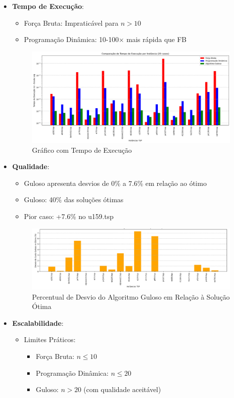 \begin{itemize}
\item \textbf{Tempo de Execução}:
  \begin{itemize}
  \item Força Bruta: Impraticável para $n > 10$
  \item Programação Dinâmica: 10-100× mais rápida que FB
  \end{itemize}

  \begin{figure}[!htb]
    \centering
    \includegraphics[width=.9\textwidth]{images/analise_detalhada_tempo_de_execucao.png}
    \caption{Gráfico com Tempo de Execução}
    \label{fig:aa}
    \end{figure}
  
\item \textbf{Qualidade}:
  \begin{itemize}
    \item Guloso apresenta desvios de 0\% a 7.6\% em relação ao ótimo
  \item Guloso: 40\% das soluções ótimas
  \item Pior caso: +7.6\% no u159.tsp
  \end{itemize}

  \begin{figure}[!htb]
    \centering
    \includegraphics[width=.9\textwidth]{images/qualidade.png}
    \caption{Percentual de Desvio do Algoritmo Guloso em Relação à Solução Ótima}
    \label{fig:aa}
    \end{figure}

\item \textbf{Escalabilidade}:
    \begin{itemize}
    \item Limites Práticos:
        \begin{itemize}
        \item Força Bruta: $n \leq 10$
        \item Programação Dinâmica: $n \leq 20$
        \item Guloso: $n > 20$ (com qualidade aceitável)
        \end{itemize}
    \end{itemize}
  

\end{itemize}
